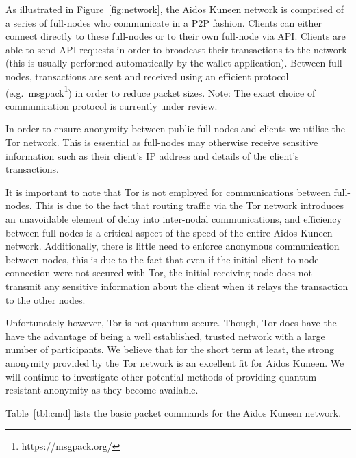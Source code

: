 \documentclass[a4paper,10pt,twocolumn]{article}
\begin{document}
As illustrated in Figure~\ref{fig:network}, the Aidos Kuneen network is comprised of a series of full-nodes who communicate in a P2P fashion. 
Clients can either connect directly to these full-nodes or to their own full-node via API\@. Clients are able to send API requests in order to broadcast their transactions to the network (this is usually performed automatically
by the wallet application). Between full-nodes, transactions are sent and received using an efficient protocol (e.g.\ msgpack\footnote{https://msgpack.org/}) in order to reduce packet sizes.
Note: The exact choice of communication protocol is currently under review.

In order to ensure anonymity between public full-nodes and clients we utilise the Tor network. This is essential as full-nodes
may otherwise receive sensitive information such as their client's IP address and details of the client's transactions.  

It is important to note that Tor is not employed for communications between full-nodes. This is due to the fact that routing traffic via the Tor network introduces an unavoidable element of delay into inter-nodal communications, and efficiency between full-nodes 
is a critical aspect of the speed of the entire Aidos Kuneen network. Additionally, there is little need to enforce anonymous communication between nodes, this is due to the fact that even if the initial client-to-node connection were not secured with Tor, the initial receiving node 
does not transmit any sensitive information about the client when it relays the transaction to the other nodes.

Unfortunately however, Tor is not quantum secure. Though, Tor does have the have the advantage of being a well established, trusted network with a large number of participants. We believe that for the short term at least, the strong anonymity provided 
by the Tor network is an excellent fit for Aidos Kuneen. We will continue to investigate other potential methods of providing quantum-resistant anonymity as they become available. 

Table~\ref{tbl:cmd} lists the basic packet commands for the Aidos Kuneen network.

\end{document}
